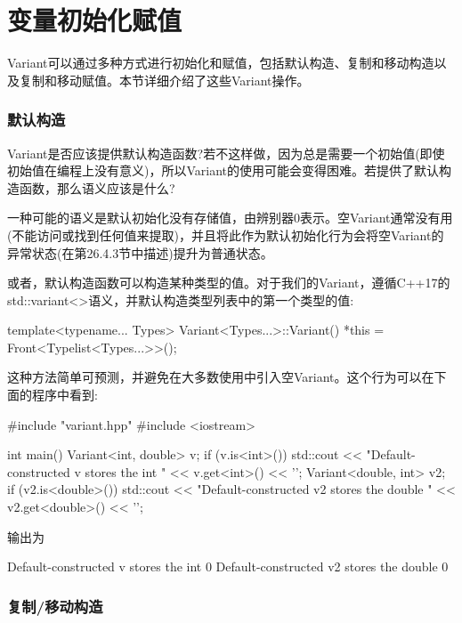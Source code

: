 \section{变量初始化赋值}
Variant可以通过多种方式进行初始化和赋值，包括默认构造、复制和移动构造以及复制和移动赋值。本节详细介绍了这些Variant操作。

\subsubsection{默认构造}

Variant是否应该提供默认构造函数?若不这样做，因为总是需要一个初始值(即使初始值在编程上没有意义)，所以Variant的使用可能会变得困难。若提供了默认构造函数，那么语义应该是什么?

一种可能的语义是默认初始化没有存储值，由辨别器0表示。空Variant通常没有用(不能访问或找到任何值来提取)，并且将此作为默认初始化行为会将空Variant的异常状态(在第26.4.3节中描述)提升为普通状态。

或者，默认构造函数可以构造某种类型的值。对于我们的Variant，遵循C++17的std::variant<>语义，并默认构造类型列表中的第一个类型的值:

\begin{cpp}
template<typename... Types>
Variant<Types...>::Variant() {
	*this = Front<Typelist<Types...>>();
}
\end{cpp}

这种方法简单可预测，并避免在大多数使用中引入空Variant。这个行为可以在下面的程序中看到:

\begin{cpp}
#include "variant.hpp"
#include <iostream>

int main()
{
	Variant<int, double> v;
	if (v.is<int>()) {
		std::cout << "Default-constructed v stores the int "
		<< v.get<int>() << '\n';
	}
	Variant<double, int> v2;
	if (v2.is<double>()) {
		std::cout << "Default-constructed v2 stores the double "
				<< v2.get<double>() << '\n';
	}
}
\end{cpp}

输出为

\begin{shell}
Default-constructed v stores the int 0
Default-constructed v2 stores the double 0
\end{shell}

\subsubsection{复制/移动构造}

